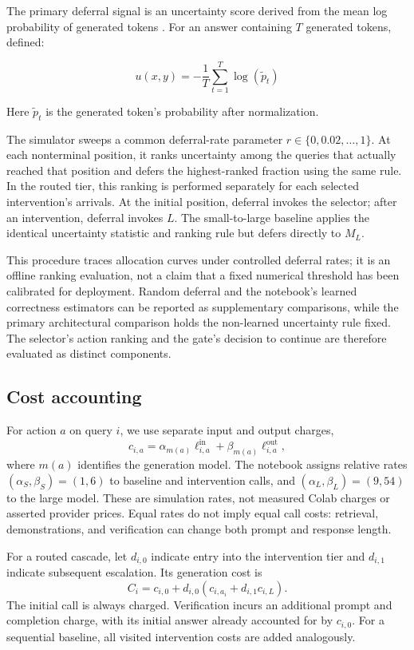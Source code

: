 \documentclass[sigconf]{acmart}
\begin{document}
The primary deferral signal is an uncertainty score derived from the mean log probability of generated tokens \cite{Gupta2024}. For an answer containing $T$ generated tokens, defined:

$$ u(x,y)=-\frac{1}{T}\sum_{t=1}^{T}\log(\widetilde p_t) $$

Here $\widetilde p_t$ is the generated token's probability after normalization.

The simulator sweeps a common deferral-rate parameter $r\in\{0,0.02,\ldots,1\}$. At each nonterminal position, it ranks uncertainty among the queries that actually reached that position and defers the highest-ranked fraction using the same rule. In the routed tier, this ranking is performed separately for each selected intervention's arrivals. At the initial position, deferral invokes the selector; after an intervention, deferral invokes $L$. The small-to-large baseline applies the identical uncertainty statistic and ranking rule but defers directly to $M_L$.

This procedure traces allocation curves under controlled deferral rates; it is an offline ranking evaluation, not a claim that a fixed numerical threshold has been calibrated for deployment. Random deferral and the notebook's learned correctness estimators can be reported as supplementary comparisons, while the primary architectural comparison holds the non-learned uncertainty rule fixed. The selector's action ranking and the gate's decision to continue are therefore evaluated as distinct components.

\subsection{Cost accounting}

For action $a$ on query $i$, we use separate input and output charges,
\begin{equation}
c_{i,a}=\alpha_{m(a)}\ell^{\mathrm{in}}_{i,a}
       +\beta_{m(a)}\ell^{\mathrm{out}}_{i,a},
\end{equation}
where $m(a)$ identifies the generation model. The notebook assigns relative rates $(\alpha_S,\beta_S)=(1,6)$ to baseline and intervention calls, and $(\alpha_L,\beta_L)=(9,54)$ to the large model. These are simulation rates, not measured Colab charges or asserted provider prices. Equal rates do not imply equal call costs: retrieval, demonstrations, and verification can change both prompt and response length.

For a routed cascade, let $d_{i,0}$ indicate entry into the intervention tier and $d_{i,1}$ indicate subsequent escalation. Its generation cost is
\begin{equation}
C_i=c_{i,0}+d_{i,0}\left(c_{i,a_i}+d_{i,1}c_{i,L}\right).
\end{equation}
The initial call is always charged. Verification incurs an additional prompt and completion charge, with its initial answer already accounted for by $c_{i,0}$. For a sequential baseline, all visited intervention costs are added analogously.
\end{document}
